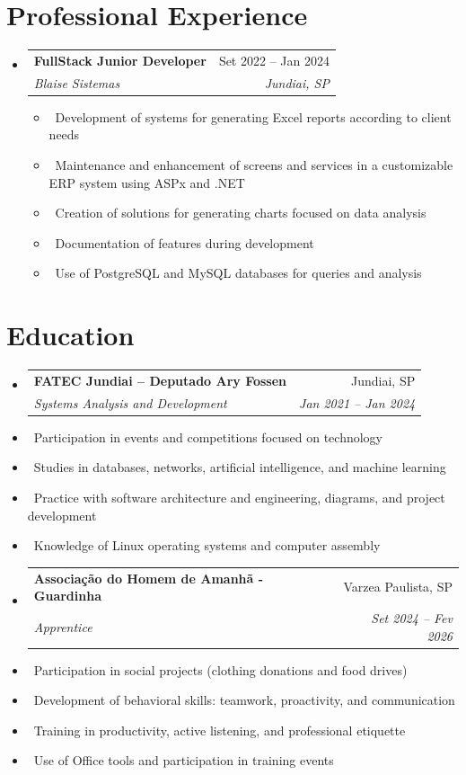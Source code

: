 \documentclass[letterpaper,10pt]{article}
\makeatletter
\newcommand{\resumeItem}[1]{\item\small{#1}}
\newcommand{\resumeSubheading}[4]{
\vspace{-1pt}\item
  \begin{tabular*}{0.97\textwidth}[t]{l@{\extracolsep{\fill}}r}
    \textbf{#1} & #2 \\
    \textit{#3} & \textit{#4} \\
  \end{tabular*}\vspace{-7pt}
}
\newcommand{\resumeSubHeadingList}{\begin{itemize}[leftmargin=0.15in, label={}]}
\newcommand{\resumeSubHeadingListEnd}{\end{itemize}}
\makeatother
\begin{document}
\section{Professional Experience}
\resumeSubHeadingList
  \resumeSubheading
      {FullStack Junior Developer}{Set 2022 -- Jan 2024}
      {Blaise Sistemas}{Jundiai, SP}
      \resumeSubHeadingList
          \resumeItem{\textbullet\ Development of systems for generating Excel reports according to client needs}
          \resumeItem{\textbullet\ Maintenance and enhancement of screens and services in a customizable ERP system using ASPx and .NET}
          \resumeItem{\textbullet\ Creation of solutions for generating charts focused on data analysis}
          \resumeItem{\textbullet\ Documentation of features during development}
          \resumeItem{\textbullet\ Use of PostgreSQL and MySQL databases for queries and analysis}
      \resumeSubHeadingListEnd
\resumeSubHeadingListEnd

\section{Education}
\resumeSubHeadingList
  \resumeSubheading
      {FATEC Jundiai – Deputado Ary Fossen}{Jundiai, SP}
      {Systems Analysis and Development}{Jan 2021 -- Jan 2024}
      \resumeItem{\textbullet\ Participation in events and competitions focused on technology}
      \resumeItem{\textbullet\ Studies in databases, networks, artificial intelligence, and machine learning}
      \resumeItem{\textbullet\ Practice with software architecture and engineering, diagrams, and project development}
      \resumeItem{\textbullet\ Knowledge of Linux operating systems and computer assembly}
    \resumeSubHeadingListEnd
\resumeSubHeadingList
  \resumeSubheading
      {Associação do Homem de Amanhã - Guardinha}{Varzea Paulista, SP}
      {Apprentice}{Set 2024 --  Fev 2026}
       \resumeItem{\textbullet\ Participation in social projects (clothing donations and food drives)}
       \resumeItem{\textbullet\ Development of behavioral skills: teamwork, proactivity, and communication}
       \resumeItem{\textbullet\ Training in productivity, active listening, and professional etiquette}
       \resumeItem{\textbullet\ Use of Office tools and participation in training events}
\resumeSubHeadingListEnd
\end{document}
